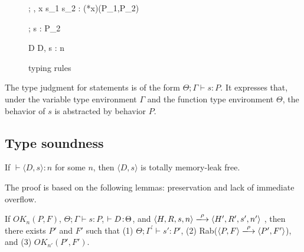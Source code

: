 \begin{figure}
\begin{minipage}{\textwidth}
{\Theta ; \Gamma, x \vdash \IFNULL\Sirx \; \THEN s_{1}\; \ELSE s_{2} : (*x)(P_1,P_2)}


{\Theta ; \Gamma \vdash s : P_{2}}

        {\vdash D \COL \Theta}
{\vdash \langle D, s \rangle : n}

\end{minipage}
\caption{typing rules}
\label{fig:TypingRules}
\end{figure}

The type judgment for statements is of the form $\Theta ; \Gamma
\vdash s : P$.  It expresses that, under the variable type environment
\(\Gamma\) and the function type environment \(\Theta\), the behavior
of $s$ is abstracted by behavior $P$.

\subsection{Type soundness}
\begin{theorem}\label{thm1}
If $\vdash \langle D, s \rangle : n$ for some \(n\), then \(\langle D,
s \rangle\) is totally memory-leak free.
\end{theorem}

The proof is based on the following lemmas: preservation and lack of
immediate overflow.

\begin{lemma}[Preservation]
\label{lem:preservation}
If \( OK_{n}(P, F)\), \(\Theta; \Gamma \vdash s : P \), \(\vdash D \!:\!
\Theta\), and \( \langle H,R,s,n \rangle \xlongrightarrow{\rho} \langle
H',R',s', n' \rangle \) , then there exists \(P'\) and \(F'\) such that (1) \( \Theta;
\Gamma^{'} \vdash s' : P'\), (2) Rab(\(\langle P, F \rangle \xlongrightarrow{\rho} \langle P', F' \rangle\)), and (3)
\(OK_{n'}(P', F')\).
\end{lemma}

